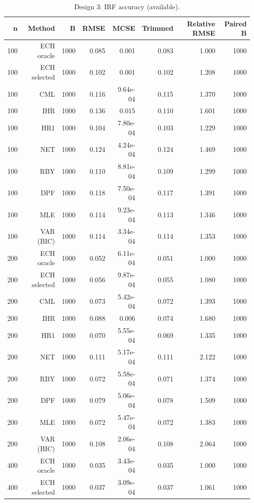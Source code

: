 \begin{table}[p]\centering
\caption{Design 3: IRF accuracy (available).}
\small
\begin{tabular}{rrrrrrrr}\toprule
n & Method & B & RMSE & MCSE & Trimmed & Relative RMSE & Paired B \\\midrule
100 & ECH oracle & 1000 & 0.085 & 0.001 & 0.083 & 1.000 & 1000 \\
100 & ECH selected & 1000 & 0.102 & 0.001 & 0.102 & 1.208 & 1000 \\
100 & CML & 1000 & 0.116 & 9.64e-04 & 0.115 & 1.370 & 1000 \\
100 & IHR & 1000 & 0.136 & 0.015 & 0.110 & 1.601 & 1000 \\
100 & HR1 & 1000 & 0.104 & 7.80e-04 & 0.103 & 1.229 & 1000 \\
100 & NET & 1000 & 0.124 & 4.24e-04 & 0.124 & 1.469 & 1000 \\
100 & RBY & 1000 & 0.110 & 8.81e-04 & 0.109 & 1.299 & 1000 \\
100 & DPF & 1000 & 0.118 & 7.50e-04 & 0.117 & 1.391 & 1000 \\
100 & MLE & 1000 & 0.114 & 9.23e-04 & 0.113 & 1.346 & 1000 \\
100 & VAR (BIC) & 1000 & 0.114 & 3.34e-04 & 0.114 & 1.353 & 1000 \\
200 & ECH oracle & 1000 & 0.052 & 6.11e-04 & 0.051 & 1.000 & 1000 \\
200 & ECH selected & 1000 & 0.056 & 9.87e-04 & 0.055 & 1.080 & 1000 \\
200 & CML & 1000 & 0.073 & 5.42e-04 & 0.072 & 1.393 & 1000 \\
200 & IHR & 1000 & 0.088 & 0.006 & 0.074 & 1.680 & 1000 \\
200 & HR1 & 1000 & 0.070 & 5.55e-04 & 0.069 & 1.335 & 1000 \\
200 & NET & 1000 & 0.111 & 5.17e-04 & 0.111 & 2.122 & 1000 \\
200 & RBY & 1000 & 0.072 & 5.58e-04 & 0.071 & 1.374 & 1000 \\
200 & DPF & 1000 & 0.079 & 5.06e-04 & 0.078 & 1.509 & 1000 \\
200 & MLE & 1000 & 0.072 & 5.47e-04 & 0.072 & 1.383 & 1000 \\
200 & VAR (BIC) & 1000 & 0.108 & 2.06e-04 & 0.108 & 2.064 & 1000 \\
400 & ECH oracle & 1000 & 0.035 & 3.43e-04 & 0.035 & 1.000 & 1000 \\
400 & ECH selected & 1000 & 0.037 & 3.09e-04 & 0.037 & 1.061 & 1000 \\

\end{tabular}
\end{table}
